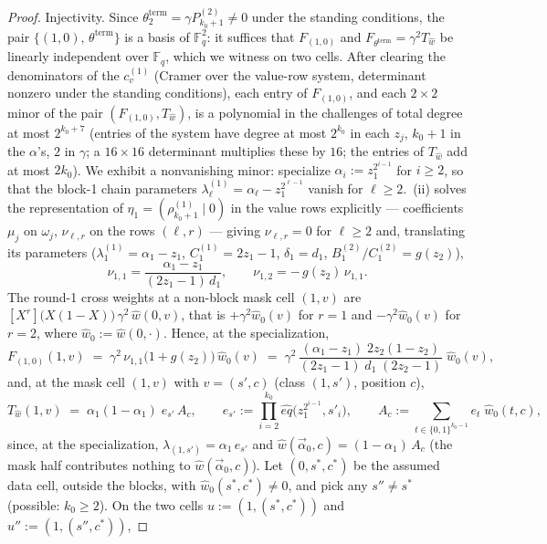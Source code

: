 \documentclass{article}
\newcommand{\Fq}{\mathbb{F}_q}
\theoremstyle{definition}
\begin{document}
\begin{proof}
Injectivity. Since $\theta^{\mathrm{term}}_2 = \gamma P^{(2)}_{k_0+1} \neq 0$ under the standing conditions, the pair $\{(1,0),\, \theta^{\mathrm{term}}\}$ is a basis of $\Fq^2$: it suffices that $F_{(1,0)}$ and $F_{\theta^{\mathrm{term}}} = \gamma^2 T_{\hat{w}}$ be linearly independent over $\Fq$, which we witness on two cells. After clearing the denominators of the $c^{(1)}_v$ (Cramer over the value-row system, determinant nonzero under the standing conditions), each entry of $F_{(1,0)}$, and each $2 \times 2$ minor of the pair $(F_{(1,0)}, T_{\hat{w}})$, is a polynomial in the challenges of total degree at most $2^{k_0 + 7}$ (entries of the system have degree at most $2^{k_0}$ in each $z_j$, $k_0 + 1$ in the $\alpha$'s, $2$ in $\gamma$; a $16 \times 16$ determinant multiplies these by $16$; the entries of $T_{\hat{w}}$ add at most $2 k_0$). We exhibit a nonvanishing minor: specialize $\alpha_i := z_1^{2^{i-1}}$ for $i \geq 2$, so that the block-1 chain parameters $\lambda^{(1)}_\ell = \alpha_\ell - z_1^{2^{\ell-1}}$ vanish for $\ell \geq 2$. \,(ii) solves the representation of $\eta_1 = (\rho^{(1)}_{k_0+1} \mid 0)$ in the value rows explicitly --- coefficients $\mu_j$ on $\omega_j$, $\nu_{\ell,r}$ on the rows $(\ell, r)$ --- giving $\nu_{\ell,r} = 0$ for $\ell \geq 2$ and, translating its parameters ($\lambda^{(1)}_1 = \alpha_1 - z_1$, $C^{(1)}_1 = 2z_1 - 1$, $\delta_1 = d_1$, $B^{(2)}_1/C^{(2)}_1 = g(z_2)$),
\[
\nu_{1,1} = \frac{\alpha_1 - z_1}{(2 z_1 - 1)\, d_1} , \qquad \nu_{1,2} = -\, g(z_2)\, \nu_{1,1} .
\]
The round-1 cross weights at a non-block mask cell $(1, v)$ are $[X^r]\big(X (1-X)\big)\, \gamma^2\, \hat{w}(0, v)$, that is $+\gamma^2 \hat{w}_0(v)$ for $r = 1$ and $-\gamma^2 \hat{w}_0(v)$ for $r = 2$, where $\hat{w}_0 := \hat{w}(0, \cdot)$. Hence, at the specialization,
\[
F_{(1,0)}(1, v) \;=\; \gamma^2\, \nu_{1,1} \big(1 + g(z_2)\big)\, \hat{w}_0(v) \;=\; \gamma^2\, \frac{(\alpha_1 - z_1)\; 2 z_2 (1 - z_2)}{(2z_1 - 1)\; d_1\; (2 z_2 - 1)}\; \hat{w}_0(v) ,
\]
and, at the mask cell $(1, v)$ with $v = (s', c)$ (class $(1, s')$, position $c$),
\[
T_{\hat{w}}(1, v) \;=\; \alpha_1 (1 - \alpha_1)\; e_{s'}\, A_c , \qquad e_{s'} := \prod_{i = 2}^{k_0} \hat{eq}\big(z_1^{2^{i-1}}, s'_i\big) , \qquad A_c := \sum_{t \in \{0,1\}^{k_0 - 1}} e_t\; \hat{w}_0(t, c) ,
\]
since, at the specialization, $\lambda_{(1, s')} = \alpha_1\, e_{s'}$ and $\hat{w}(\vec{\alpha}_0, c) = (1 - \alpha_1)\, A_c$ (the mask half contributes nothing to $\hat{w}(\vec{\alpha}_0, c)$). Let $(0, s^*, c^*)$ be the assumed data cell, outside the blocks, with $\hat{w}_0(s^*, c^*) \neq 0$, and pick any $s'' \neq s^*$ (possible: $k_0 \geq 2$). On the two cells $u := (1, (s^*, c^*))$ and $u'' := (1, (s'', c^*))$,

\end{proof}
\end{document}
